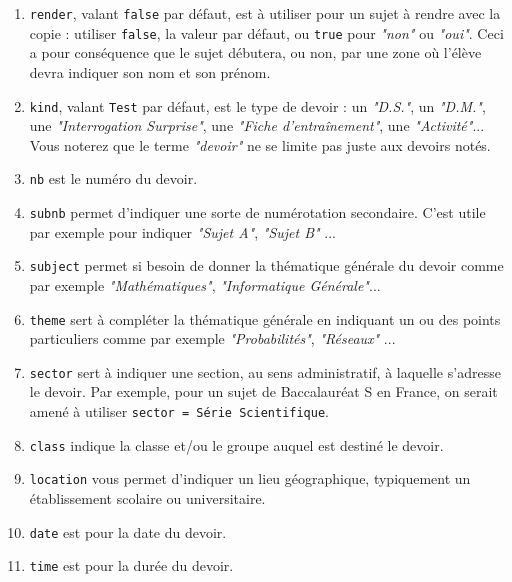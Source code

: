 \documentclass[12pt,a4paper]{scrartcl}
\theoremstyle{definition}
\begin{document}
\begin{enumerate}
	\item \verb+render+, valant \verb+false+ par défaut, est à utiliser pour un sujet à rendre avec la copie : utiliser \verb+false+, la valeur par défaut, ou  \verb+true+ pour \emph{"non"} ou \emph{"oui"}.
	Ceci a pour conséquence que le sujet débutera, ou non, par une zone où l'élève devra indiquer son nom et son prénom.

	\item \verb+kind+, valant \verb+Test+ par défaut, est le type de devoir : un \emph{"D.S."}, un \emph{"D.M."}, une \emph{"Interrogation Surprise"}, une \emph{"Fiche d'entraînement"}, une \emph{"Activité"}...
	Vous noterez que le terme \emph{"devoir"} ne se limite pas juste aux devoirs notés.

	\item \verb+nb+ est le numéro du devoir.

	\item \verb+subnb+ permet d'indiquer une sorte de numérotation secondaire. C'est utile par exemple pour indiquer \emph{"Sujet A"}, \emph{"Sujet B"} ...

	\item \verb+subject+ permet si besoin de donner la thématique générale du devoir comme par exemple \emph{"Mathématiques"}, \emph{"Informatique Générale"}...

	\item \verb+theme+ sert à compléter la thématique générale en indiquant un ou des points particuliers comme par exemple \emph{"Probabilités"}, \emph{"Réseaux"} ...

	\item \verb+sector+ sert à indiquer une section, au sens administratif, à laquelle s'adresse le devoir. Par exemple, pour un sujet de Baccalauréat S en France, on serait amené à utiliser \verb+sector = Série Scientifique+.

	\item \verb+class+ indique la classe et/ou le groupe auquel est destiné le devoir.

	\item \verb+location+ vous permet d'indiquer un lieu géographique, typiquement un établissement scolaire ou universitaire.

	\item \verb+date+ est pour la date du devoir.

	\item \verb+time+ est pour la durée du devoir.
\end{enumerate}
\end{document}
